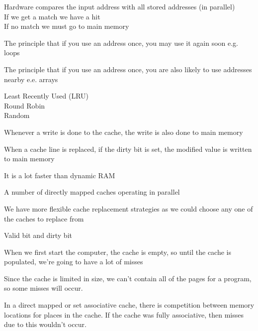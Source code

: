 
{Hardware compares the input address with all stored addresses (in parallel)\\
If we get a match we have a hit\\
If no match we must go to main memory}

{The principle that if you use an address once, you may use it again soon e.g. loops}

{The principle that if you use an address once, you are also likely to use addresses nearby e.e. arrays}

{Least Recently Used (LRU)\\
Round Robin\\
Random}

{Whenever a write is done to the cache, the write is also done to main memory}

{When a cache line is replaced, if the dirty bit is set, the modified value is written to main memory}

{It is a lot faster than dynamic RAM}

{A number of directly mapped caches operating in parallel}

{We have more flexible cache replacement strategies as we could choose any one of the caches to replace from}

{Valid bit and dirty bit}

{When we first start the computer, the cache is empty, so until the cache is populated, we're going to have a lot of misses}

{Since the cache is limited in size, we can’t contain all of the pages for a program, so some misses
will occur.}

{In a direct mapped or set associative cache, there is competition between memory locations for
places in the cache. If the cache was fully associative, then misses due to this wouldn’t occur.}